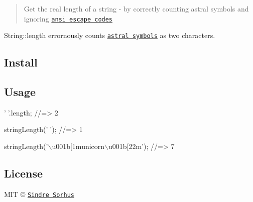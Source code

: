 \begin{quote}
Get the real length of a string -\/ by correctly counting astral symbols and ignoring \href{https://github.com/sindresorhus/strip-ansi}{\tt ansi escape codes} \end{quote}


{\ttfamily String\+::length} errornously counts \href{http://www.tlg.uci.edu/~opoudjis/unicode/unicode_astral.html}{\tt astral symbols} as two characters.

\subsection*{Install}




\subsection*{Usage}


\begin{DoxyCode}
'🐴'.length;
//=> 2

stringLength('🐴');
//=> 1

stringLength('\(\backslash\)u001b[1municorn\(\backslash\)u001b[22m');
//=> 7
\end{DoxyCode}


\subsection*{License}

M\+IT © \href{http://sindresorhus.com}{\tt Sindre Sorhus} 